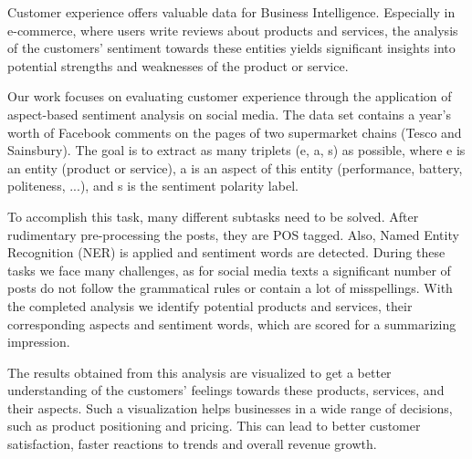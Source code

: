 Customer experience offers valuable data for Business Intelligence. Especially in e-commerce, where users write reviews about products and services, the analysis of the customers' sentiment towards these entities yields significant insights into potential strengths and weaknesses of the product or service.

Our work focuses on evaluating customer experience through the application of aspect-based sentiment analysis on social media. The data set contains a year's worth of Facebook comments on the pages of two supermarket chains (Tesco and Sainsbury). The goal is to extract as many triplets (e, a, s) as possible, where e is an entity (product or service), a is an aspect of this entity (performance, battery, politeness, ...), and s is the sentiment polarity label.

To accomplish this task, many different subtasks need to be solved. After rudimentary pre-processing the posts, they are POS tagged. Also, Named Entity Recognition (NER) is applied and sentiment words are detected. During these tasks we face many challenges, as for social media texts a significant number of posts do not follow the grammatical rules or contain a lot of misspellings. With the completed analysis we identify potential products and services, their corresponding aspects and sentiment words, which are scored for a summarizing impression.

The results obtained from this analysis are visualized to get a better understanding of the customers' feelings towards these products, services, and their aspects. Such a visualization helps businesses in a wide range of decisions, such as product positioning and pricing. This can lead to better customer satisfaction, faster reactions to trends and overall revenue growth.
